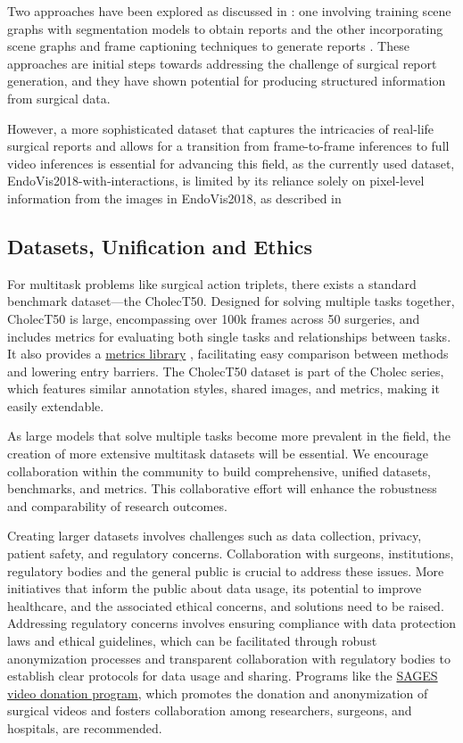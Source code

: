 Two approaches have been explored as discussed in  : one involving training scene graphs with segmentation models to obtain reports \citep{seenivasan2022global}  and the other incorporating scene graphs and frame captioning techniques to generate reports \citep{mobarakol_task_aware}. These approaches are initial steps towards addressing the challenge of surgical report generation, and they have shown potential for producing structured information from surgical data.

However, a more sophisticated dataset that captures the intricacies of real-life surgical reports and allows for a transition from frame-to-frame inferences to full video inferences is essential for advancing this field, as the currently used dataset, EndoVis2018-with-interactions, is limited by its reliance solely on pixel-level information from the images in EndoVis2018, as described in 


\subsection{Datasets, Unification and Ethics}
For multitask problems like surgical action triplets, there exists a standard benchmark dataset—the CholecT50. Designed for solving multiple tasks together, CholecT50 is large, encompassing over 100k frames across 50 surgeries, and includes metrics for evaluating both single tasks and relationships between tasks. It also provides a  \href{https://github.com/CAMMA-public/ivtmetrics}{metrics library} , facilitating easy comparison between methods and lowering entry barriers. The CholecT50 dataset is part of the Cholec series, which features similar annotation styles, shared images, and metrics, making it easily extendable.

As large models that solve multiple tasks become more prevalent in the field, the creation of more extensive multitask datasets will be essential. We encourage collaboration within the community to build comprehensive, unified datasets, benchmarks, and metrics. This collaborative effort will enhance the robustness and comparability of research outcomes.

Creating larger datasets involves challenges such as data collection, privacy, patient safety, and regulatory concerns.  Collaboration with surgeons, institutions, regulatory bodies and the general public is crucial to address these issues. More initiatives that inform the public about data usage, its potential to improve healthcare, and the associated ethical concerns, and solutions need to be raised. Addressing regulatory concerns involves ensuring compliance with data protection laws and ethical guidelines, which can be facilitated through robust anonymization processes and transparent collaboration with regulatory bodies to establish clear protocols for data usage and sharing.  Programs like the \href{https://www.cvschallenge.org/data-donation-video}{SAGES video donation program}, which promotes the donation and anonymization of surgical videos and fosters collaboration among researchers, surgeons, and hospitals, are recommended.

